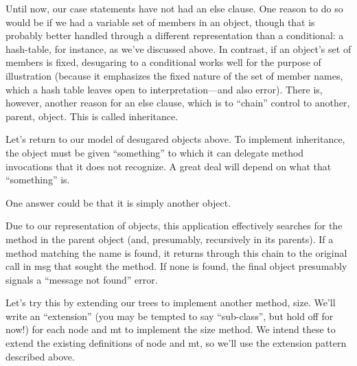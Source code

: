 
Until now, our case statements have not had an else clause. One reason to do so
would be if we had a variable set of members in an object, though that is
probably better handled through a different representation than a conditional: a
hash-table, for instance, as we’ve discussed above. In contrast, if an object’s
set of members is fixed, desugaring to a conditional works well for the purpose
of illustration (because it emphasizes the fixed nature of the set of member
names, which a hash table leaves open to interpretation—and also error). There
is, however, another reason for an else clause, which is to “chain” control to
another, parent, object. This is called inheritance.

Let’s return to our model of desugared objects above. To implement inheritance,
the object must be given “something” to which it can delegate method invocations
that it does not recognize. A great deal will depend on what that “something”
is.

One answer could be that it is simply another object.

Due to our representation of objects, this application effectively searches for
the method in the parent object (and, presumably, recursively in its parents).
If a method matching the name is found, it returns through this chain to the
original call in msg that sought the method. If none is found, the final object
presumably signals a “message not found” error.


Let’s try this by extending our trees to implement another method, size. We’ll
write an “extension” (you may be tempted to say “sub-class”, but hold off for
now!) for each node and mt to implement the size method. We intend these to
extend the existing definitions of node and mt, so we’ll use the extension
pattern described above.

\secdown
{}
\secup
